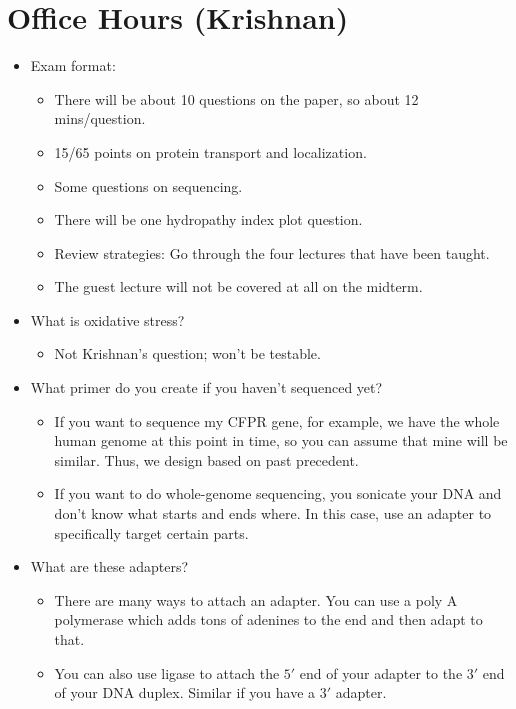 \documentclass[../notes.tex]{subfiles}
\begin{document}
\section{Office Hours (Krishnan)}
\begin{itemize}
    \item Exam format:
    \begin{itemize}
        \item There will be about 10 questions on the paper, so about 12 mins/question.
        \item 15/65 points on protein transport and localization.
        \item Some questions on sequencing.
        \item There will be one hydropathy index plot question.
        \item Review strategies: Go through the four lectures that have been taught.
        \item The guest lecture will not be covered at all on the midterm.
    \end{itemize}
    \item What is oxidative stress?
    \begin{itemize}
        \item Not Krishnan's question; won't be testable.
    \end{itemize}
    \item What primer do you create if you haven't sequenced yet?
    \begin{itemize}
        \item If you want to sequence my CFPR gene, for example, we have the whole human genome at this point in time, so you can assume that mine will be similar. Thus, we design based on past precedent.
        \item If you want to do whole-genome sequencing, you sonicate your DNA and don't know what starts and ends where. In this case, use an adapter to specifically target certain parts.
    \end{itemize}
    \item What are these adapters?
    \begin{itemize}
        \item There are many ways to attach an adapter. You can use a poly A polymerase which adds tons of adenines to the end and then adapt to that.
        \item You can also use ligase to attach the $5'$ end of your adapter to the $3'$ end of your DNA duplex. Similar if you have a $3'$ adapter.
    \end{itemize}

\end{itemize}
\end{document}
